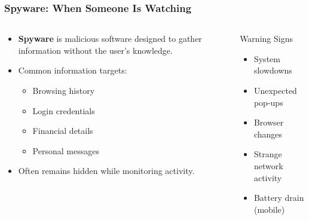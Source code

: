 \documentclass{beamer}
\begin{document}
\begin{frame}
    \frametitle{Spyware: When Someone Is Watching}
    
    \begin{columns}
        \begin{column}{0.5\textwidth}
            \begin{itemize}
                \item \textbf{Spyware} is malicious software designed to gather information without the user's knowledge.
                \item Common information targets:
                    \begin{itemize}
                        \item Browsing history
                        \item Login credentials
                        \item Financial details
                        \item Personal messages
                    \end{itemize}
                \item Often remains hidden while monitoring activity.
            \end{itemize}
        \end{column}
        \begin{column}{0.5\textwidth}
            \begin{alertblock}{Warning Signs}
                \begin{itemize}
                    \item System slowdowns
                    \item Unexpected pop-ups
                    \item Browser changes
                    \item Strange network activity
                    \item Battery drain (mobile)
                \end{itemize}
            \end{alertblock}
        \end{column}
    \end{columns}
\end{frame}
\end{document}
